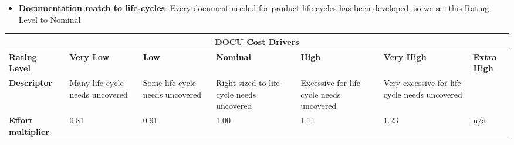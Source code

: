 \begin{itemize}
\item \textbf{Documentation match to life-cycles}: Every document needed for product life-cycles has been developed, so we set this Rating Level to Nominal
\end{itemize}
\hspace*{-3cm}\begin{tabular}{|p{3cm}|p{2cm}|p{2cm}|p{2cm}|p{2cm}|p{2cm}|p{2cm}|}
\hline
\multicolumn{7}{|c|}{\textbf{DOCU Cost Drivers}}\\
\hline
\hline
\textbf{Rating Level} & \textbf{Very Low} & \textbf{Low} & \textbf{Nominal} & \textbf{High} & \textbf{Very High} & \textbf{Extra High}\\
\hline
\textbf{Descriptor} & Many life-cycle needs uncovered & Some life-cycle needs uncovered & Right sized to life-cycle needs uncovered & Excessive for life-cycle needs uncovered & Very excessive for life-cycle needs uncovered & \\
\hline
\textbf{Effort multiplier} & 0.81 & 0.91 & 1.00 & 1.11 & 1.23 & n/a\\
\hline 
\end{tabular}